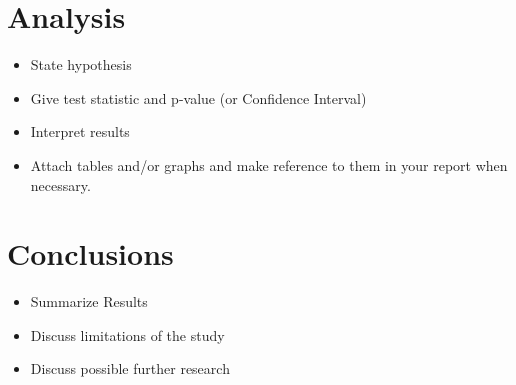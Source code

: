 \documentclass[10pt]{article}
\begin{document}
\section*{Analysis}
\label{sec-5}

\begin{itemize}
\item State hypothesis
\item Give test statistic and p-value (or Confidence Interval)
\item Interpret results
\item Attach tables and/or graphs and make reference to them in your report when necessary.
\end{itemize}
\section*{Conclusions}
\label{sec-6}

\begin{itemize}
\item Summarize Results
\item Discuss limitations of the study
\item Discuss possible further research
\end{itemize}
\end{document}

